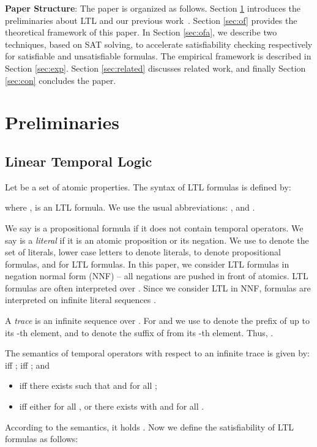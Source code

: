 \documentclass[conference]{IEEEtran}
\newtheorem{definition}{Definition}
\begin{document}
\noindent
\textbf{Paper Structure}: The paper is organized as
follows. Section \ref{sec:pre} introduces the preliminaries about LTL and our
previous work~\cite{LZPVH13}. Section \ref{sec:of} provides the theoretical
framework of this paper. In Section \ref{sec:ofa}, we describe two techniques, 
based on SAT solving, to accelerate satisfiability checking respectively for
satisfiable and unsatisfiable formulas. The empirical framework
is described in Section \ref{sec:exp}. Section \ref{sec:related} discusses 
related work, and finally Section \ref{sec:con} concludes the paper.
\section{Preliminaries}\label{sec:pre}
\subsection{Linear Temporal Logic}\label{sec:ltl}
Let  be a set of atomic properties. 
The syntax of LTL formulas is defined by:

where ,  is an LTL formula.  We use the usual
abbreviations: 
, and . 

We say  is a propositional formula if it does not contain
temporal operators. We say  is a \emph{literal}
if it is an atomic proposition or its negation.  We use  to denote
the set of literals, lower case letters  to denote
literals,  to denote propositional
formulas, and  for LTL formulas.  
In this paper, we consider LTL formulas in negation normal form (NNF) -- all negations are 
pushed in front of atomics. 
LTL formulas are often interpreted over . Since we consider LTL in NNF, formulas are interpreted on infinite literal sequences
. 


A \emph{trace}  is an infinite sequence over
. For  and  we use  to denote the prefix of  up to its -th element,
and  to denote the suffix of 
from its -th element.  Thus, . 
\iffalse
To introduce the semantics of LTL formulas, we need the notion of \emph{consistent traces} 
at first:

\begin{definition}[Consistent Trace]
  We say a literal set  is \emph{consistent} iff for all 
  we have that . A trace  is
  consistent iff  is consistent for all .
\end{definition}

In the remainder of this paper, if not stated explicitly, all traces
considered are assumed to be consistent. 
\fi
The semantics of temporal operators with respect to an infinite trace  is 
given by:  iff ;
 iff ; and
\begin{itemize}
\item  iff there exists 
such that  and for all ;
\item  iff either
   for all , or there exists 
  with  and  for
  all .
\end{itemize}
According to the semantics, it holds . Now we define the satisfiability of LTL formulas as follows:
\end{document}
